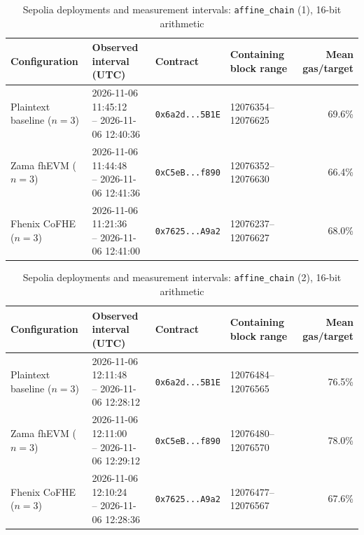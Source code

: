 \begin{table}[!t]
\caption{Sepolia deployments and measurement intervals: \texttt{affine\_chain} (1), 16-bit arithmetic}
\label{tab:sepolia-experiment-deployments-circuits-euint16-circuits-w16-affine-chain-k1}
\centering
\footnotesize
\setlength{\tabcolsep}{4pt}
\begin{tabular}{|l|l|l|l|r|}
\hline
\textbf{Configuration} &
\textbf{Observed interval (UTC)} &
\textbf{Contract} &
\textbf{Containing block range} &
\textbf{Mean gas/target} \\
\hline
Plaintext baseline (\(n=3\)) &
\shortstack[l]{2026-11-06 11:45:12 \\ -- 2026-11-06 12:40:36} &
\texttt{0x6a2d...5B1E} &
12076354--12076625 &
69.6\% \\
\hline
Zama fhEVM (\(n=3\)) &
\shortstack[l]{2026-11-06 11:44:48 \\ -- 2026-11-06 12:41:36} &
\texttt{0xC5eB...f890} &
12076352--12076630 &
66.4\% \\
\hline
Fhenix CoFHE (\(n=3\)) &
\shortstack[l]{2026-11-06 11:21:36 \\ -- 2026-11-06 12:41:00} &
\texttt{0x7625...A9a2} &
12076237--12076627 &
68.0\% \\
\hline
\end{tabular}
\end{table}

\begin{table}[!t]
\caption{Sepolia deployments and measurement intervals: \texttt{affine\_chain} (2), 16-bit arithmetic}
\label{tab:sepolia-experiment-deployments-circuits-euint16-circuits-w16-affine-chain-k2}
\centering
\footnotesize
\setlength{\tabcolsep}{4pt}
\begin{tabular}{|l|l|l|l|r|}
\hline
\textbf{Configuration} &
\textbf{Observed interval (UTC)} &
\textbf{Contract} &
\textbf{Containing block range} &
\textbf{Mean gas/target} \\
\hline
Plaintext baseline (\(n=3\)) &
\shortstack[l]{2026-11-06 12:11:48 \\ -- 2026-11-06 12:28:12} &
\texttt{0x6a2d...5B1E} &
12076484--12076565 &
76.5\% \\
\hline
Zama fhEVM (\(n=3\)) &
\shortstack[l]{2026-11-06 12:11:00 \\ -- 2026-11-06 12:29:12} &
\texttt{0xC5eB...f890} &
12076480--12076570 &
78.0\% \\
\hline
Fhenix CoFHE (\(n=3\)) &
\shortstack[l]{2026-11-06 12:10:24 \\ -- 2026-11-06 12:28:36} &
\texttt{0x7625...A9a2} &
12076477--12076567 &
67.6\% \\
\hline
\end{tabular}
\end{table}

